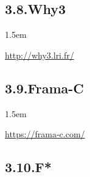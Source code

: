 \documentclass[12pt,twoside]{article}
\begin{document}
\subsection{3.8.\hspace*{0.5em}Why3}\label{sec-why3}%

\begin{mddefinitions}%


\begin{mdbmarginx}{}{}{}{1.5em}%
\begin{mddefdata}%
\href{http://why3.lri.fr/}{{\ttfamily http://\hspace{0pt}why3.\hspace{0pt}lri.\hspace{0pt}fr/\hspace{0pt}}}%
\end{mddefdata}%
\end{mdbmarginx}%
\end{mddefinitions}%

\subsection{3.9.\hspace*{0.5em}Frama-C}\label{sec-frama-c}%

\begin{mddefinitions}%


\begin{mdbmarginx}{}{}{}{1.5em}%
\begin{mddefdata}%
\href{https://frama-c.com/}{{\ttfamily https://\hspace{0pt}frama-\hspace{0pt}c.\hspace{0pt}com/\hspace{0pt}}}%
\end{mddefdata}%
\end{mdbmarginx}%
\end{mddefinitions}%

\subsection{3.10.\hspace*{0.5em}F*}\label{sec-f-}%
\end{document}
